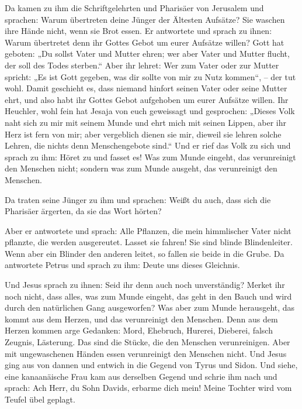  Da kamen zu ihm die Schriftgelehrten und Pharisäer von
Jerusalem und sprachen:  Warum übertreten deine Jünger der
Ältesten Aufsätze? Sie waschen ihre Hände nicht, wenn sie Brot essen.
 Er antwortete und sprach zu ihnen: Warum übertretet denn
ihr Gottes Gebot um eurer Aufsätze willen?  Gott hat
geboten: „Du sollst Vater und Mutter ehren; wer aber Vater und Mutter
flucht, der soll des Todes sterben.``  Aber ihr lehret:
Wer zum Vater oder zur Mutter spricht: „Es ist Gott gegeben, was dir
sollte von mir zu Nutz kommen``, -- der tut wohl.  Damit
geschieht es, dass niemand hinfort seinen Vater oder seine Mutter ehrt,
und also habt ihr Gottes Gebot aufgehoben um eurer Aufsätze willen.
 Ihr Heuchler, wohl fein hat Jesaja von euch geweissagt
und gesprochen:  „Dieses Volk naht sich zu mir mit seinem
Munde und ehrt mich mit seinen Lippen, aber ihr Herz ist fern von mir;
 aber vergeblich dienen sie mir, dieweil sie lehren solche
Lehren, die nichts denn Menschengebote sind.``  Und er
rief das Volk zu sich und sprach zu ihm: Höret zu und fasset es!
 Was zum Munde eingeht, das verunreinigt den Menschen
nicht; sondern was zum Munde ausgeht, das verunreinigt den Menschen.

 Da traten seine Jünger zu ihm und sprachen: Weißt du
auch, dass sich die Pharisäer ärgerten, da sie das Wort hörten?

 Aber er antwortete und sprach: Alle Pflanzen, die mein
himmlischer Vater nicht pflanzte, die werden ausgereutet.
 Lasset sie fahren! Sie sind blinde Blindenleiter. Wenn
aber ein Blinder den anderen leitet, so fallen sie beide in die Grube.
 Da antwortete Petrus und sprach zu ihm: Deute uns dieses
Gleichnis.

 Und Jesus sprach zu ihnen: Seid ihr denn auch noch
unverständig?  Merket ihr noch nicht, dass alles, was zum
Munde eingeht, das geht in den Bauch und wird durch den natürlichen Gang
ausgeworfen?  Was aber zum Munde herausgeht, das kommt
aus dem Herzen, und das verunreinigt den Menschen.  Denn
aus dem Herzen kommen arge Gedanken: Mord, Ehebruch, Hurerei, Dieberei,
falsch Zeugnis, Lästerung.  Das sind die Stücke, die den
Menschen verunreinigen. Aber mit ungewaschenen Händen essen verunreinigt
den Menschen nicht.  Und Jesus ging aus von dannen und
entwich in die Gegend von Tyrus und Sidon.  Und siehe,
eine kanaanäische Frau kam aus derselben Gegend und schrie ihm nach und
sprach: Ach Herr, du Sohn Davids, erbarme dich mein! Meine Tochter wird
vom Teufel übel geplagt.


